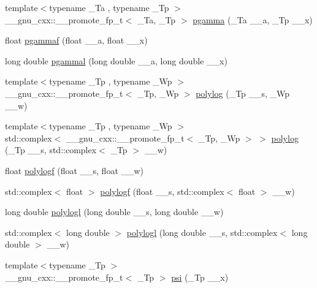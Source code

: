\begin{DoxyCompactItemize}
{\footnotesize template$<$typename \+\_\+\+Ta , typename \+\_\+\+Tp $>$ }\\\+\_\+\+\_\+gnu\+\_\+cxx\+::\+\_\+\+\_\+promote\+\_\+fp\+\_\+t$<$ \+\_\+\+Ta, \+\_\+\+Tp $>$ \hyperlink{group__gnu__math__spec__func_gaa78927de2c62e6c63f4b3506f5e1a8f6}{pgamma} (\+\_\+\+Ta \+\_\+\+\_\+a, \+\_\+\+Tp \+\_\+\+\_\+x)
\item 
float \hyperlink{group__gnu__math__spec__func_ga980f118a42eabd526da7988d96bf16a0}{pgammaf} (float \+\_\+\+\_\+a, float \+\_\+\+\_\+x)
\item 
long double \hyperlink{group__gnu__math__spec__func_gab7975808066fe4a4c05823c57d4c5e73}{pgammal} (long double \+\_\+\+\_\+a, long double \+\_\+\+\_\+x)
\item 
{\footnotesize template$<$typename \+\_\+\+Tp , typename \+\_\+\+Wp $>$ }\\\+\_\+\+\_\+gnu\+\_\+cxx\+::\+\_\+\+\_\+promote\+\_\+fp\+\_\+t$<$ \+\_\+\+Tp, \+\_\+\+Wp $>$ \hyperlink{group__gnu__math__spec__func_gac2e50fbb0f648209e667af0111277134}{polylog} (\+\_\+\+Tp \+\_\+\+\_\+s, \+\_\+\+Wp \+\_\+\+\_\+w)
\item 
{\footnotesize template$<$typename \+\_\+\+Tp , typename \+\_\+\+Wp $>$ }\\std\+::complex$<$ \+\_\+\+\_\+gnu\+\_\+cxx\+::\+\_\+\+\_\+promote\+\_\+fp\+\_\+t$<$ \+\_\+\+Tp, \+\_\+\+Wp $>$ $>$ \hyperlink{group__gnu__math__spec__func_ga665f8375c4e48394bca251d8bf8379f9}{polylog} (\+\_\+\+Tp \+\_\+\+\_\+s, std\+::complex$<$ \+\_\+\+Tp $>$ \+\_\+\+\_\+w)
\item 
float \hyperlink{group__gnu__math__spec__func_ga5bcdd35473144a6d8efc258a79bc82d8}{polylogf} (float \+\_\+\+\_\+s, float \+\_\+\+\_\+w)
\item 
std\+::complex$<$ float $>$ \hyperlink{group__gnu__math__spec__func_ga5376edb72358b777035a78b929deb49f}{polylogf} (float \+\_\+\+\_\+s, std\+::complex$<$ float $>$ \+\_\+\+\_\+w)
\item 
long double \hyperlink{group__gnu__math__spec__func_ga3aa007b4b4e345c30be015ab145d5598}{polylogl} (long double \+\_\+\+\_\+s, long double \+\_\+\+\_\+w)
\item 
std\+::complex$<$ long double $>$ \hyperlink{group__gnu__math__spec__func_ga9eb79e506eda210610bc59c1912b4d0f}{polylogl} (long double \+\_\+\+\_\+s, std\+::complex$<$ long double $>$ \+\_\+\+\_\+w)
\item 
{\footnotesize template$<$typename \+\_\+\+Tp $>$ }\\\+\_\+\+\_\+gnu\+\_\+cxx\+::\+\_\+\+\_\+promote\+\_\+fp\+\_\+t$<$ \+\_\+\+Tp $>$ \hyperlink{group__gnu__math__spec__func_gaae7574990cdbb6a637d39c2c036928c0}{psi} (\+\_\+\+Tp \+\_\+\+\_\+x)

\end{DoxyCompactItemize}
